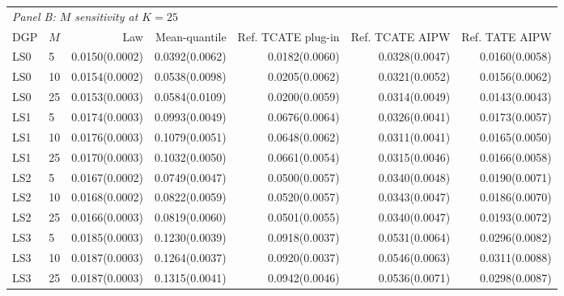 \begin{table}[!ht]
\begin{tabular}{llrrrrr}
\midrule
\multicolumn{7}{l}{\textit{Panel B: $M$ sensitivity at $K=25$}} \\
DGP & $M$ & Law & Mean-quantile & Ref. TCATE plug-in & Ref. TCATE AIPW & Ref. TATE AIPW \\
\midrule
LS0 & 5 & 0.0150(0.0002) & 0.0392(0.0062) & 0.0182(0.0060) & 0.0328(0.0047) & 0.0160(0.0058) \\
LS0 & 10 & 0.0154(0.0002) & 0.0538(0.0098) & 0.0205(0.0062) & 0.0321(0.0052) & 0.0156(0.0062) \\
LS0 & 25 & 0.0153(0.0003) & 0.0584(0.0109) & 0.0200(0.0059) & 0.0314(0.0049) & 0.0143(0.0043) \\
LS1 & 5 & 0.0174(0.0003) & 0.0993(0.0049) & 0.0676(0.0064) & 0.0326(0.0041) & 0.0173(0.0057) \\
LS1 & 10 & 0.0176(0.0003) & 0.1079(0.0051) & 0.0648(0.0062) & 0.0311(0.0041) & 0.0165(0.0050) \\
LS1 & 25 & 0.0170(0.0003) & 0.1032(0.0050) & 0.0661(0.0054) & 0.0315(0.0046) & 0.0166(0.0058) \\
LS2 & 5 & 0.0167(0.0002) & 0.0749(0.0047) & 0.0500(0.0057) & 0.0340(0.0048) & 0.0190(0.0071) \\
LS2 & 10 & 0.0168(0.0002) & 0.0822(0.0059) & 0.0520(0.0057) & 0.0343(0.0047) & 0.0186(0.0070) \\
LS2 & 25 & 0.0166(0.0003) & 0.0819(0.0060) & 0.0501(0.0055) & 0.0340(0.0047) & 0.0193(0.0072) \\
LS3 & 5 & 0.0185(0.0003) & 0.1230(0.0039) & 0.0918(0.0037) & 0.0531(0.0064) & 0.0296(0.0082) \\
LS3 & 10 & 0.0187(0.0003) & 0.1264(0.0037) & 0.0920(0.0037) & 0.0546(0.0063) & 0.0311(0.0088) \\
LS3 & 25 & 0.0187(0.0003) & 0.1315(0.0041) & 0.0942(0.0046) & 0.0536(0.0071) & 0.0298(0.0087) \\
\bottomrule
\end{tabular}
\end{table}
